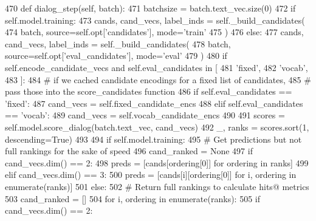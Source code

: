 \begin{DoxyCode}
470     \textcolor{keyword}{def }dialog\_step(self, batch):
471         batchsize = batch.text\_vec.size(0)
472         \textcolor{keywordflow}{if} self.model.training:
473             cands, cand\_vecs, label\_inds = self.\_build\_candidates(
474                 batch, source=self.opt[\textcolor{stringliteral}{'candidates'}], mode=\textcolor{stringliteral}{'train'}
475             )
476         \textcolor{keywordflow}{else}:
477             cands, cand\_vecs, label\_inds = self.\_build\_candidates(
478                 batch, source=self.opt[\textcolor{stringliteral}{'eval\_candidates'}], mode=\textcolor{stringliteral}{'eval'}
479             )
480             \textcolor{keywordflow}{if} self.encode\_candidate\_vecs \textcolor{keywordflow}{and} self.eval\_candidates \textcolor{keywordflow}{in} [
481                 \textcolor{stringliteral}{'fixed'},
482                 \textcolor{stringliteral}{'vocab'},
483             ]:
484                 \textcolor{comment}{# if we cached candidate encodings for a fixed list of candidates,}
485                 \textcolor{comment}{# pass those into the score\_candidates function}
486                 \textcolor{keywordflow}{if} self.eval\_candidates == \textcolor{stringliteral}{'fixed'}:
487                     cand\_vecs = self.fixed\_candidate\_encs
488                 \textcolor{keywordflow}{elif} self.eval\_candidates == \textcolor{stringliteral}{'vocab'}:
489                     cand\_vecs = self.vocab\_candidate\_encs
490 
491         scores = self.model.score\_dialog(batch.text\_vec, cand\_vecs)
492         \_, ranks = scores.sort(1, descending=\textcolor{keyword}{True})
493 
494         \textcolor{keywordflow}{if} self.model.training:
495             \textcolor{comment}{# Get predictions but not full rankings for the sake of speed}
496             cand\_ranked = \textcolor{keywordtype}{None}
497             \textcolor{keywordflow}{if} cand\_vecs.dim() == 2:
498                 preds = [cands[ordering[0]] \textcolor{keywordflow}{for} ordering \textcolor{keywordflow}{in} ranks]
499             \textcolor{keywordflow}{elif} cand\_vecs.dim() == 3:
500                 preds = [cands[i][ordering[0]] \textcolor{keywordflow}{for} i, ordering \textcolor{keywordflow}{in} enumerate(ranks)]
501         \textcolor{keywordflow}{else}:
502             \textcolor{comment}{# Return full rankings to calculate hits@ metrics}
503             cand\_ranked = []
504             \textcolor{keywordflow}{for} i, ordering \textcolor{keywordflow}{in} enumerate(ranks):
505                 \textcolor{keywordflow}{if} cand\_vecs.dim() == 2:

\end{DoxyCode}
